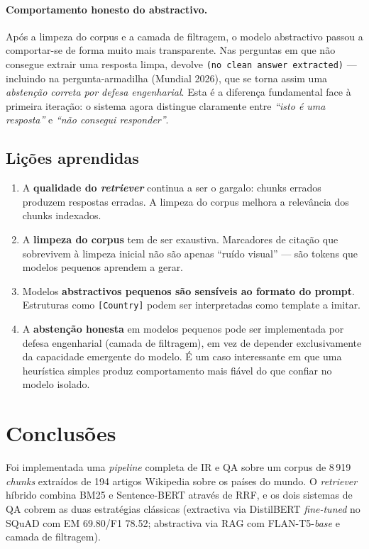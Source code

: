 \documentclass[11pt,a4paper]{article}
\begin{document}
\paragraph{Comportamento honesto do abstractivo.} Após a limpeza do corpus e a camada de filtragem, o modelo abstractivo passou a comportar-se de forma muito mais transparente. Nas perguntas em que não consegue extrair uma resposta limpa, devolve \texttt{(no clean answer extracted)} --- incluindo na pergunta-armadilha (Mundial 2026), que se torna assim uma \emph{abstenção correta por defesa engenharial}. Esta é a diferença fundamental face à primeira iteração: o sistema agora distingue claramente entre \emph{``isto é uma resposta''} e \emph{``não consegui responder''}.

\subsection{Lições aprendidas}

\begin{enumerate}[noitemsep]
    \item A \textbf{qualidade do \emph{retriever}} continua a ser o gargalo: chunks errados produzem respostas erradas. A limpeza do corpus melhora a relevância dos chunks indexados.
    \item A \textbf{limpeza do corpus} tem de ser exaustiva. Marcadores de citação que sobrevivem à limpeza inicial não são apenas ``ruído visual'' --- são tokens que modelos pequenos aprendem a gerar.
    \item Modelos \textbf{abstractivos pequenos são sensíveis ao formato do prompt}. Estruturas como \texttt{[Country]} podem ser interpretadas como template a imitar.
    \item A \textbf{abstenção honesta} em modelos pequenos pode ser implementada por defesa engenharial (camada de filtragem), em vez de depender exclusivamente da capacidade emergente do modelo. É um caso interessante em que uma heurística simples produz comportamento mais fiável do que confiar no modelo isolado.
\end{enumerate}

\section{Conclusões}

Foi implementada uma \emph{pipeline} completa de IR e QA sobre um corpus de 8\,919 \emph{chunks} extraídos de 194 artigos Wikipedia sobre os países do mundo. O \emph{retriever} híbrido combina BM25 e Sentence-BERT através de RRF, e os dois sistemas de QA cobrem as duas estratégias clássicas (extractiva via DistilBERT \emph{fine-tuned} no SQuAD com EM 69.80/F1 78.52; abstractiva via RAG com FLAN-T5-\emph{base} e camada de filtragem).
\end{document}

